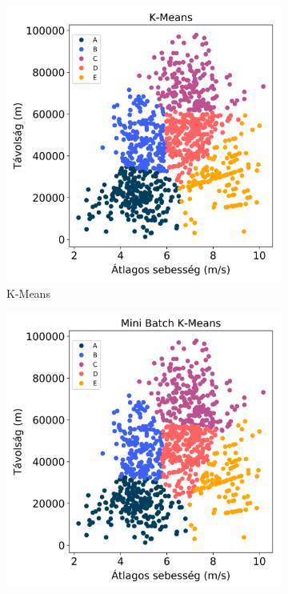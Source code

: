\begin{figure}[!h]
	\centering
	\begin{subfigure}{.5\linewidth}
		\centering
		\includegraphics[width=\textwidth,keepaspectratio]{kepek/clustering/age_group_2_kmeans_results.png}
		\caption{K-Means}
		\label{subfig:clusteringAgeGroupTwoKmeans}
	\end{subfigure}%
	\begin{subfigure}{.5\linewidth}
		\centering
		\includegraphics[width=\textwidth,keepaspectratio]{kepek/clustering/age_group_2_minibatch_results.png}

\end{subfigure}
\end{figure}
